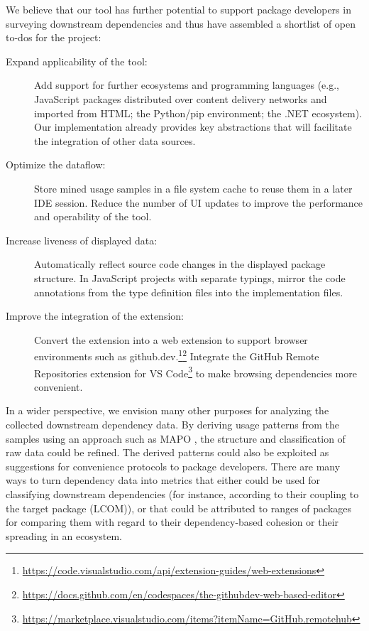 We believe that our tool has further potential to support package developers in surveying downstream dependencies and thus have assembled a shortlist of open to-dos for the project:

\begin{description}
	\item[Expand applicability of the tool:]
		Add support for further ecosystems and programming languages (e.g., JavaScript packages distributed over content delivery networks and imported from HTML; the Python/pip environment; the .NET ecosystem).
		Our implementation already provides key abstractions that will facilitate the integration of other data sources.
	\item[Optimize the dataflow:]
		Store mined usage samples in a file system cache to reuse them in a later IDE session.
		Reduce the number of UI updates to improve the performance and operability of the tool.
	\item[Increase liveness of displayed data:]
		Automatically reflect source code changes in the displayed package structure.
		In JavaScript projects with separate typings, mirror the code annotations from the type definition files into the implementation files.
	\item[Improve the integration of the extension:]
		Convert the extension into a web extension to support browser environments such as github.dev.\footnote{\url{https://code.visualstudio.com/api/extension-guides/web-extensions}}\footnote{\url{https://docs.github.com/en/codespaces/the-githubdev-web-based-editor}}
		Integrate the GitHub Remote Repositories extension for VS Code\footnote{\url{https://marketplace.visualstudio.com/items?itemName=GitHub.remotehub}} to make browsing dependencies more convenient.
\end{description}

In a wider perspective, we envision many other purposes for analyzing the collected downstream dependency data.
By deriving usage patterns from the samples using an approach such as MAPO \cite{zhong2009mapo}, the structure and classification of raw data could be refined.
The derived patterns could also be exploited as suggestions for convenience protocols to package developers.
There are many ways to turn dependency data into metrics that either could be used for classifying downstream dependencies (for instance, according to their coupling to the target package (LCOM)), or that could be attributed to ranges of packages for comparing them with regard to their dependency-based cohesion or their spreading in an ecosystem.

